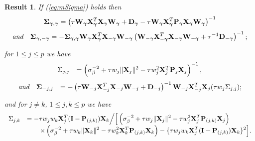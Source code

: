\documentclass[11pt]{article}
\newtheorem{Result}{Result}
\newtheorem{Main Result}{Main Result}
\def\vectorfontone{\bf}
\def\vectorfonttwo{\boldsymbol}
\def\vu{{\vectorfontone u}}                      %
\def\vgamma{{\vectorfonttwo \gamma}}             %
\def\matrixfontone{\bf}
\def\matrixfonttwo{\boldsymbol}
\def\mD{{\matrixfontone D}}                      %
\def\mI{{\matrixfontone I}}                      %
\def\mP{{\matrixfontone P}}                      %
\def\mW{{\matrixfontone W}}                      %
\def\mX{{\matrixfontone X}}                      %
\def\mSigma{{\matrixfonttwo \Sigma}}             %
\def\ds{\displaystyle}
\begin{document}
\begin{Result}\label{res:5}
	If (\ref{eq:mSigma}) holds then
	\begin{equation}\label{eq:SigmaRearrange0}
	\mSigma_{\vgamma,\vgamma}
	= \left(
	\tau \mW_{\vgamma}\mX_{\vgamma}^T\mX_{\vgamma}\mW_{\vgamma}
	+ \mD_{\vgamma}
	- \tau\mW_{\vgamma}\mX_{\vgamma}^T\mP_{\vgamma}\mX_{\vgamma}\mW_{\vgamma}
	\right)^{-1}
	\end{equation}
	\begin{equation}\label{eq:SigmaRearrange3}
	\mbox{\it and}\quad\mSigma_{\vgamma,-\vgamma}
	= - \mSigma_{\vgamma,\vgamma}\mW_{\vgamma}\mX_{\vgamma}^T\mX_{-\vgamma}\mW_{-\vgamma}
	\left( \mW_{-\vgamma}\mX_{-\vgamma}^T\mX_{-\vgamma}\mW_{-\vgamma}
	+ \tau^{-1}\mD_{-\vgamma}\right)^{-1};
	\end{equation}
	
	\noindent for $1\le j\le p$ we have
	\begin{equation}\label{eq:SigmaRearrange1}
	\begin{array}{rl}
	\ds \Sigma_{j,j} & = \left(
	\sigma_\beta^{-2}
	+ \tau w_j\|\mX_j\|^2
	- \tau w_j^2\mX_j^T\mP_j\mX_j
	\right)^{-1},
	\end{array}
	\end{equation}
	\begin{equation}\label{eq:SigmaRearrange4}
	\begin{array}{rl}
	\mbox{\it and}\quad\ds \mSigma_{-j,j} & \ds =
	- \left( \tau \mW_{-j}\mX_{-j}^T\mX_{-j}\mW_{-j} + \mD_{-j} \right)^{-1}
	\mW_{-j}\mX_{-j}^T\mX_j(\tau w_j \Sigma_{j,j});
	\end{array}
	\end{equation}
	
	\noindent and for $j\ne k$, $1\le j,k\le p$ we have
	\begin{equation}\label{eq:SigmaRearrange2}
	\begin{array}{rl}
	\ds \Sigma_{j,k}
	& \ds = -\tau w_j w_k\mX_j^T(\mI - \mP_{(j,k)})\mX_k
	\Big/
	\Big[ \left(
	\sigma_\beta^{-2} + \tau w_j\|\mX_j\|^2 - \tau w_j^2\mX_j^T\mP_{(j,k)}\mX_j
	\right)
	\\ %
	& \ds \qquad
	\times \left(
	\sigma_\beta^{-2} + \tau w_k\|\mX_k\|^2 - \tau w_k^2\mX_k^T\mP_{(j,k)}\mX_k
	\right) - \{\tau w_j w_k\mX_j^T(\mI - \mP_{(j,k)})\mX_k\}^2 \Big].
	\end{array}
	\end{equation}
	

\end{Result}
\end{document}
